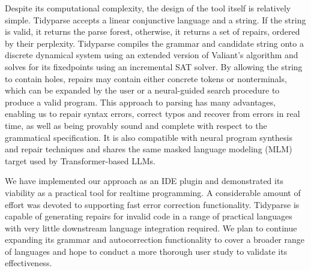 \documentclass[sigplan,review,anonymous,acmsmall]{acmart}\settopmatter{printfolios=false,printccs=false,printacmref=false}
\begin{document}
  Despite its computational complexity, the design of the tool itself is relatively simple. Tidyparse accepts a linear conjunctive language and a string. If the string is valid, it returns the parse forest, otherwise, it returns a set of repairs, ordered by their perplexity. Tidyparse compiles the grammar and candidate string onto a discrete dynamical system using an extended version of Valiant's algorithm and solves for its fixedpoints using an incremental SAT solver. By allowing the string to contain holes, repairs may contain either concrete tokens or nonterminals, which can be expanded by the user or a neural-guided search procedure to produce a valid program. This approach to parsing has many advantages, enabling us to repair syntax errors, correct typos and recover from errors in real time, as well as being provably sound and complete with respect to the grammatical specification. It is also compatible with neural program synthesis and repair techniques and shares the same masked language modeling (MLM) target used by Transformer-based LLMs.

  We have implemented our approach as an IDE plugin and demonstrated its viability as a practical tool for realtime programming. A considerable amount of effort was devoted to supporting fast error correction functionality. Tidyparse is capable of generating repairs for invalid code in a range of practical languages with very little downstream language integration required. We plan to continue expanding its grammar and autocorrection functionality to cover a broader range of languages and hope to conduct a more thorough user study to validate its effectiveness.

%

%

%
%
%
%  
  
\end{document}
